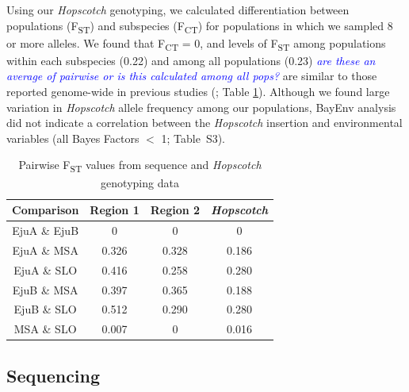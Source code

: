 \documentclass[11pt]{article}
\newcommand{\jri}[1]{\textcolor{blue}{ \emph{\scriptsize  #1}} }
\begin{document}
\begin{linenumbers}
\begin{flushleft}
Using our \emph{Hopscotch} genotyping, we calculated differentiation between populations (F\textsubscript{ST}) and subspecies (F\textsubscript{CT}) for populations in which we sampled 8 or more alleles. We found that F\textsubscript{CT} = 0, and levels of F\textsubscript{ST} among populations within each subspecies (0.22) and among all populations (0.23) \jri{are these an average of pairwise or is this calculated among all pops?} are similar to those reported genome-wide in previous studies (\citealt{Pyhajarvi2013}; Table \ref{Table1Fst}). Although we found large variation in \emph{Hopscotch} allele frequency among our populations, BayEnv analysis did not indicate a correlation between the \emph{Hopscotch} insertion and environmental variables (all Bayes Factors $<$ 1; Table~S3). 

\begin{table}[htbp]
  \centering
  \caption{Pairwise F\textsubscript{ST} values from sequence and \emph{Hopscotch} genotyping data}
  
    \begin{tabular}{cccc}\\\toprule
    \textbf{Comparison} & \textbf{Region 1} & \textbf{Region 2} & \textbf{\emph{Hopscotch}} \\\midrule
    EjuA \& EjuB & 0     & 0     & 0 \\
    EjuA \& MSA & 0.326 & 0.328 & 0.186 \\
    EjuA \& SLO & 0.416 & 0.258 & 0.280 \\
    EjuB \& MSA & 0.397 & 0.365 & 0.188 \\
    EjuB \& SLO & 0.512  & 0.290 & 0.280 \\
    MSA \& SLO & 0.007  & 0 & 0.016 \\\bottomrule
    \end{tabular}
  \label{Table1Fst}
\end{table}

\subsection*{Sequencing}


\end{flushleft}
\end{linenumbers}
\end{document}
